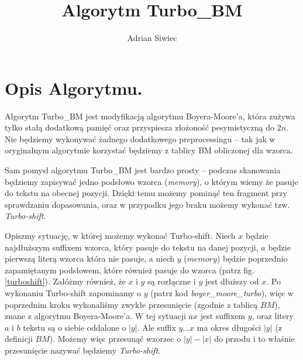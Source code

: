 \documentclass[12pt]{article}
\newcommand{\TBM}{Turbo\_BM }
\theoremstyle{plain}
\begin{document}
\title{Algorytm \TBM}
\author{Adrian Siwiec}
\maketitle

\section*{Opis Algorytmu.}
Algorytm \TBM jest modyfikacją algorytmu Boyera-Moore'a, która zużywa tylko stałą dodatkową pamięć oraz przyspiesza złożoność pesymistyczną do $2n$. Nie będziemy wykonywać żadnego dodatkowego preprocessingu -- tak jak w oryginalnym algorytmie korzystać będziemy z tablicy BM obliczonej dla wzorca.
  
Sam pomysł algorytmu \TBM jest bardzo prosty -- podczas skanowania będziemy zapisywać jedno podsłowo wzorca (\emph{memory}), o którym wiemy że pasuje do tekstu na obecnej pozycji. Dzięki temu możemy pominąć ten fragment przy sprawdzaniu dopasowania, oraz w przypadku jego braku możemy wykonać tzw. \emph{Turbo-shift}.

Opiszmy sytuację, w której możemy wykonać Turbo-shift. Niech $x$ będzie najdłuższym suffixem wzorca, który pasuje do tekstu na danej pozycji, $a$ będzie pierwszą literą wzorca która nie pasuje, a niech $y$ ($memory$) będzie poprzednio zapamiętanym podsłowem, które również pasuje do wzorca (patrz fig. \ref{turboshift}). Załóżmy również, że $x$ i $y$ są rozłączne i $y$ jest dłuższy od $x$. Po wykonaniu Turbo-shift zapominamy o $y$ (patrz kod \emph{boyer\_moore\_turbo}), więc w poprzednim kroku wykonaliśmy zwykłe przesunięcie (zgodnie z tablicą $BM$), znane z algorytmu Boyera-Moore'a. W tej sytuacji $ax$ jest suffixem $y$, oraz litery $a$ i $b$ tekstu są o siebie oddalone o $|y|$. Ale suffix $y\ldots x$ ma okres długości $|y|$ (z definicji $BM$). Możemy więc przesunąć wzorzec o $|y| - |x|$ do przodu i to właśnie przesunięcie nazywać będziemy \emph{Turbo-shift}.
\end{document}
